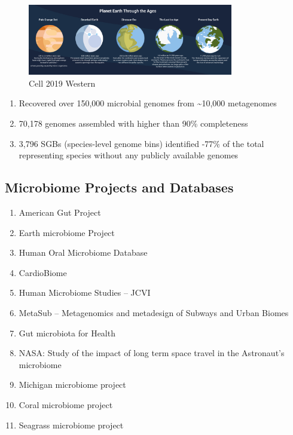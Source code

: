 \documentclass[
]{book}
\providecommand{\tightlist}{%
  \setlength{\itemsep}{0pt}\setlength{\parskip}{0pt}}
\begin{document}
\begin{figure}
\centering
\includegraphics[width=0.8\textwidth,height=\textheight]{./Figures/Planets.png}
\caption{Cell 2019 Western}
\end{figure}

\begin{enumerate}
\def\labelenumi{\arabic{enumi}.}
\item
  Recovered over 150,000 microbial genomes from \textasciitilde10,000 metagenomes
\item
  70,178 genomes assembled with higher than 90\% completeness
\item
  3,796 SGBs (species-level genome bins) identified -77\% of the total representing species without any publicly available genomes
\end{enumerate}

\hypertarget{microbiome-projects-and-databases}{%
\subsection{Microbiome Projects and Databases}\label{microbiome-projects-and-databases}}

\begin{enumerate}
\def\labelenumi{\arabic{enumi}.}
\tightlist
\item
  American Gut Project
\item
  Earth microbiome Project
\item
  Human Oral Microbiome Database
\item
  CardioBiome
\item
  Human Microbiome Studies -- JCVI
\item
  MetaSub -- Metagenomics and metadesign of Subways and Urban Biomes
\item
  Gut microbiota for Health
\item
  NASA: Study of the impact of long term space travel in the Astronaut's
  microbiome
\item
  Michigan microbiome project
\item
  Coral microbiome project
\item
  Seagrass microbiome project
\end{enumerate}
\end{document}
